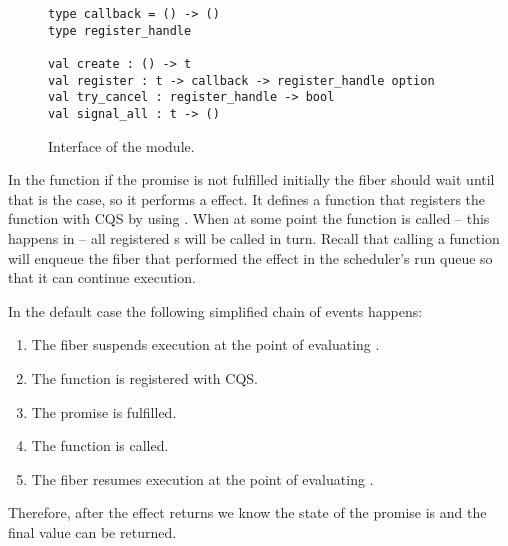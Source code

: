 \begin{figure}[ht]
  \begin{verbatim}
type callback = () -> ()
type register_handle

val create : () -> t
val register : t -> callback -> register_handle option
val try_cancel : register_handle -> bool
val signal_all : t -> ()
  \end{verbatim}
  \caption{Interface of the  module.}
  \label{fig:sched-impl-cqs}
\end{figure}

In the  function if the promise is not fulfilled initially the fiber should wait until that is the case, so it performs a \esuspend{} effect.
It defines a  function that registers the  function with CQS by using .
When at some point the  function is called -- this happens in  -- all registered s will be called in turn.
Recall that calling a  function will enqueue the fiber that performed the \esuspend{} effect in the scheduler's run queue so that it can continue execution.

In the default case the following simplified chain of events happens:
\begin{enumerate}
  \item The fiber suspends execution at the point of evaluating .
  \item The  function is registered with CQS.
  \item The promise is fulfilled.
  \item The  function is called.
  \item The fiber resumes execution at the point of evaluating .
\end{enumerate}
Therefore, after the \esuspend{} effect returns we know the state of the promise is  and the final value can be returned.

